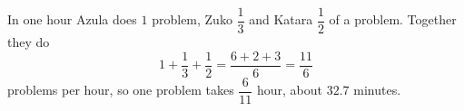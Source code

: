 In one hour Azula does $1$ problem, Zuko $\dfrac{1}{3}$ and Katara $\dfrac{1}{2}$ of a problem. Together they do
\[1+\dfrac{1}{3}+\dfrac{1}{2}=\dfrac{6+2+3}{6}=\dfrac{11}{6}\]
problems per hour, so one problem takes $\boxed{\dfrac{6}{11}\text{ hour}}$, about $32.7$ minutes.
